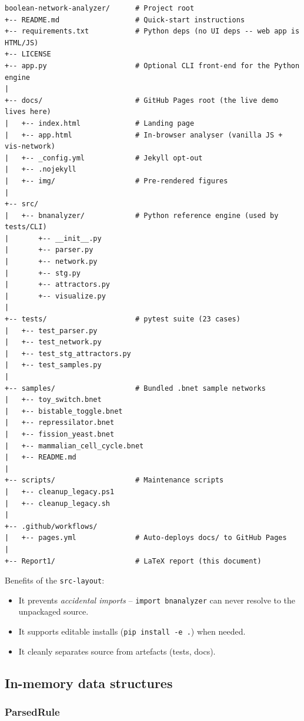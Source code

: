 \documentclass[oneside,final]{hcmut-report}
\begin{document}
\begin{verbatim}
boolean-network-analyzer/      # Project root
+-- README.md                  # Quick-start instructions
+-- requirements.txt           # Python deps (no UI deps -- web app is HTML/JS)
+-- LICENSE
+-- app.py                     # Optional CLI front-end for the Python engine
|
+-- docs/                      # GitHub Pages root (the live demo lives here)
|   +-- index.html             # Landing page
|   +-- app.html               # In-browser analyser (vanilla JS + vis-network)
|   +-- _config.yml            # Jekyll opt-out
|   +-- .nojekyll
|   +-- img/                   # Pre-rendered figures
|
+-- src/
|   +-- bnanalyzer/            # Python reference engine (used by tests/CLI)
|       +-- __init__.py
|       +-- parser.py
|       +-- network.py
|       +-- stg.py
|       +-- attractors.py
|       +-- visualize.py
|
+-- tests/                     # pytest suite (23 cases)
|   +-- test_parser.py
|   +-- test_network.py
|   +-- test_stg_attractors.py
|   +-- test_samples.py
|
+-- samples/                   # Bundled .bnet sample networks
|   +-- toy_switch.bnet
|   +-- bistable_toggle.bnet
|   +-- repressilator.bnet
|   +-- fission_yeast.bnet
|   +-- mammalian_cell_cycle.bnet
|   +-- README.md
|
+-- scripts/                   # Maintenance scripts
|   +-- cleanup_legacy.ps1
|   +-- cleanup_legacy.sh
|
+-- .github/workflows/
|   +-- pages.yml              # Auto-deploys docs/ to GitHub Pages
|
+-- Report1/                   # LaTeX report (this document)
\end{verbatim}

Benefits of the \texttt{src-layout}:
\begin{itemize}[leftmargin=*]
    \item It prevents \textit{accidental imports} -- \texttt{import bnanalyzer} can never resolve to the unpackaged source.
    \item It supports editable installs (\texttt{pip install -e .}) when needed.
    \item It cleanly separates source from artefacts (tests, docs).
\end{itemize}

\subsection{In-memory data structures}\label{subsec:data-struct}

\subsubsection{ParsedRule}
\end{document}
